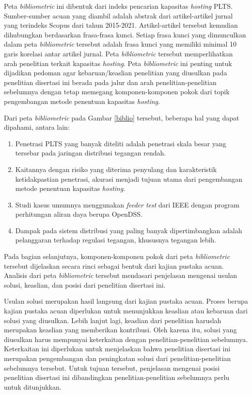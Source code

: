 Peta \textit{bibliometric} ini dibentuk dari indeks pencarian kapasitas \textit{hosting} PLTS. Sumber-sumber acuan yang diambil adalah abstrak dari artikel-artikel jurnal yang terindeks Scopus dari tahun 2015-2021. Artikel-artikel tersebut kemudian dihubungkan berdasarkan frasa-frasa kunci. Setiap frasa kunci yang dimunculkan dalam peta \textit{bibliometric} tersebut adalah frasa kunci yang memiliki minimal 10 garis korelasi antar artikel jurnal. Peta \textit{bibliometric} tersebut memperlihatkan arah penelitian terkait kapasitas \textit{hosting}. Peta \textit{bibliometric} ini penting untuk dijadikan pedoman agar kebaruan/keaslian penelitian yang diusulkan pada penelitian disertasi ini berada pada jalur dan arah penelitian-penelitian sebelumnya dengan tetap memegang komponen-komponen pokok dari topik pengembangan metode penentuan kapasitas \textit{hosting}. 

Dari peta \textit{bibliometric} pada Gambar \ref{biblio} tersebut, beberapa hal yang dapat dipahami, antara lain:
\begin{enumerate}
	\item Penetrasi PLTS yang banyak diteliti adalah penetrasi skala besar yang tersebar pada jaringan distribusi tegangan rendah. 
	\item Kaitannya dengan risiko yang diterima penyulang dan karakteristik ketidakpastian penetrasi, akurasi menjadi tujuan utama dari pengembangan metode penentuan kapasitas \textit{hosting}.
	\item Studi kasus umumnya menggunakan \textit{feeder test} dari IEEE dengan program perhitungan aliran daya berupa OpenDSS.
	\item Dampak pada sistem distribusi yang paling banyak dipertimbangkan adalah pelanggaran terhadap regulasi tegangan, khususnya tegangan lebih.
\end{enumerate}

Pada bagian selanjutnya, komponen-komponen pokok dari peta \textit{bibliometric} tersebut dijelaskan secara rinci sebagai bentuk dari kajian pustaka acuan. Analisis dari peta \textit{bibliometric} tersebut mendasari penjelasan mengenai usulan solusi, keaslian, dan posisi dari penelitian disertasi ini. 

Usulan solusi merupakan hasil langsung dari kajian pustaka acuan. Proses berupa kajian pustaka acuan diperlukan untuk menunjukkan keaslian atau kebaruan dari solusi yang diusulkan. Lebih lanjut lagi, keaslian dari penelitian haruslah merupakan keaslian yang memberikan kontribusi. Oleh karena itu, solusi yang diusulkan harus mempunyai keterkaitan dengan penelitian-penelitian sebelumnya. Keterkaitan ini diperlukan untuk menjelaskan bahwa penelitian disertasi ini merupakan pengembangan dan peningkatan solusi dari penelitian-penelitian sebelumnya tersebut. Untuk tujuan tersebut, penjelasan mengenai posisi penelitian disertasi ini dibandingkan penelitian-penelitian sebelumnya perlu untuk ditunjukkan. 

